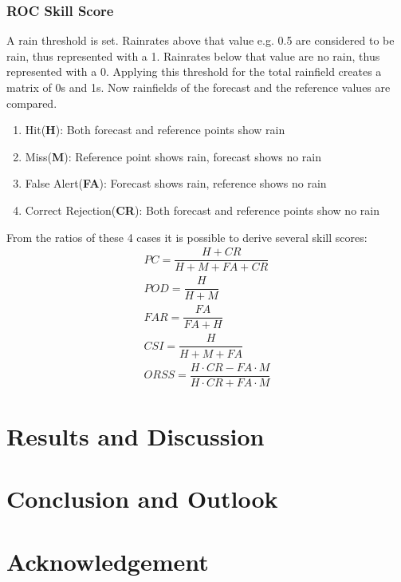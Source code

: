 \documentclass[11pt,twoside,a4paper,fleqn,x11names]{report}
\numberwithin{equation}{chapter}
\numberwithin{figure}{chapter}
\numberwithin{table}{chapter}
\begin{document}
\subsection{ROC Skill Score}
A rain threshold is set. Rainrates above that value e.g. 0.5 are considered to be rain, thus represented with a 1. Rainrates below that value are no rain, thus represented with a 0. Applying this threshold for the total rainfield creates a matrix of 0s and 1s. Now rainfields of the forecast and the reference values are compared.
\begin{enumerate}
	\item Hit(\textbf{H}): Both forecast and reference points show rain
	\item Miss(\textbf{M}): Reference point shows rain, forecast shows no rain
	\item False Alert(\textbf{FA}): Forecast shows rain, reference shows no rain
	\item Correct Rejection(\textbf{CR}): Both forecast and reference points show no rain
\end{enumerate}
From the ratios of these 4 cases it is possible to derive several skill scores:
\begin{equation}
\begin{array}{lcl}
	PC = \dfrac{H+CR}{H+M+FA+CR}\\
	POD = \dfrac{H}{H+M}\\
	FAR = \dfrac{FA}{FA+H}\\
	CSI = \dfrac{H}{H+M+FA}\\
	ORSS = \dfrac{H\cdot CR-FA\cdot M}{H\cdot CR+FA\cdot M}
\end{array}
\end{equation}
\chapter{Results and Discussion}

\chapter{Conclusion and Outlook}
\chapter{Acknowledgement}

\end{document}
